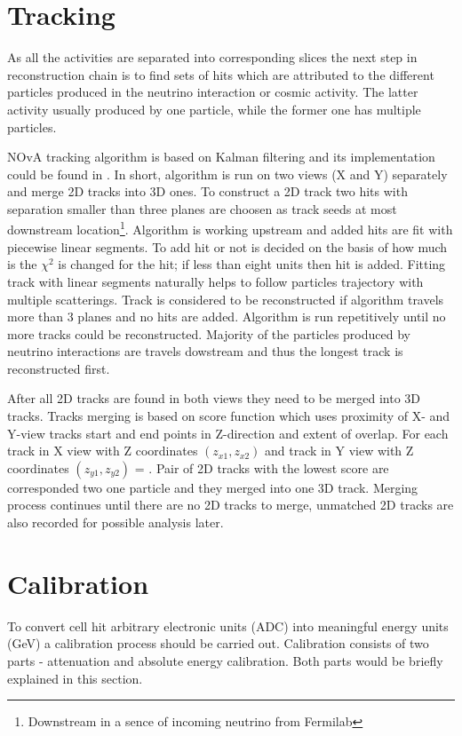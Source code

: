 \section{Tracking}
As all the activities are separated into corresponding slices the next step in reconstruction chain is 
to find sets of hits which are attributed to the different particles produced in the neutrino interaction 
or cosmic activity. The latter activity usually produced by one particle, while the former one has 
multiple particles. 

NOvA tracking algorithm is based on Kalman filtering \cite{Kalman} and its implementation could be found 
in \cite{Nick}. In short, algorithm is run on two views (X and Y) separately and merge 2D tracks into
3D ones. To construct a 2D track two hits with separation smaller than three planes are choosen as track 
seeds at most downstream location\footnote{Downstream in a sence of incoming neutrino from Fermilab}. 
Algorithm is working upstream and added hits are fit with piecewise linear segments. To add hit or not 
is decided on the basis of how much is the $\chi^2$ is changed for the hit; if less than eight units 
then hit is added. Fitting track with linear segments naturally helps to follow particles trajectory 
with multiple scatterings. Track is considered to be reconstructed if algorithm travels more than 3 planes
and no hits are added. Algorithm is run repetitively until no more tracks could be reconstructed. Majority 
of the particles produced by neutrino interactions are travels dowstream and thus the longest track is 
reconstructed first.

After all 2D tracks are found in both views they need to be merged into 3D tracks. Tracks merging is based
on score function which uses proximity of X- and Y-view tracks start and end points in Z-direction and 
extent of overlap. For each track in X view with Z coordinates $(z_{x1}, z_{x2})$ and track in Y view with
Z coordinates $(z_{y1}, z_{y2})$
\be
{} = .
\ee
Pair of 2D tracks with the lowest score are corresponded two one particle and they merged into one 3D track.
Merging process continues until there are no 2D tracks to merge, unmatched 2D tracks are also recorded
for possible analysis later.

\section{Calibration}
To convert cell hit arbitrary electronic units (ADC) into meaningful energy units (GeV) a calibration 
process should be carried out. Calibration consists of two parts - attenuation and absolute energy calibration. 
Both parts would be briefly explained in this section.

